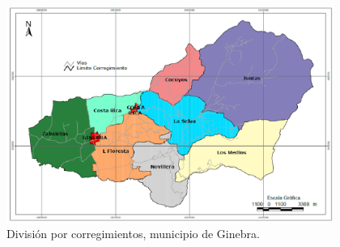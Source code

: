 \documentclass[12pt,letterpaper,openany]{book}
\begin{document}
\begin{figure}[H]
\begin{center}
\includegraphics[width=10.7cm]{./imagenes/division_corregimientos}
\caption{División por corregimientos, municipio de Ginebra.}
\end{center}
\end{figure}
\end{document}

